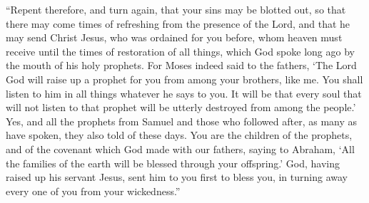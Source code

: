 {\par }{\PP {}“Repent therefore, and turn again, that your sins may be blotted out, so that there may come times of refreshing from the presence of the Lord,
and that he may send Christ Jesus, who was ordained for you before,
whom heaven must receive until the times of restoration of all things, which God spoke long ago by the mouth of his holy prophets.
For Moses indeed said to the fathers, ‘The Lord God will raise up a prophet for you from among your brothers, like me. You shall listen to him in all things whatever he says to you.
It will be that every soul that will not listen to that prophet will be utterly destroyed from among the people.’
Yes, and all the prophets from Samuel and those who followed after, as many as have spoken, they also told of these days.
You are the children of the prophets, and of the covenant which God made with our fathers, saying to Abraham, ‘All the families of the earth will be blessed through your offspring.’
God, having raised up his servant Jesus, sent him to you first to bless you, in turning away every one of you from your wickedness.”

}
